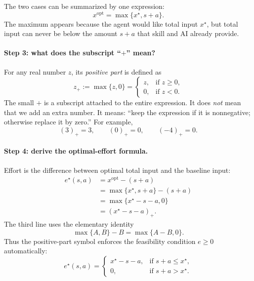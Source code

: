 \documentclass[11pt]{article}
\theoremstyle{tutorial}
\theoremstyle{remark}
\newcommand{\1}{\mathbb{I}}
\begin{document}
The two cases can be summarized by one expression:
\begin{equation}
  \boxed{x^{\mathrm{opt}}=\max\{x^\star,s+a\}.}
  \label{eq:optimal-total-input}
\end{equation}
The maximum appears because the agent would like total input $x^\star$, but total input can never be below
the amount $s+a$ that skill and AI already provide.

\paragraph{Step 3: what does the subscript ``$+$'' mean?}
For any real number $z$, its \emph{positive part} is defined as
\[
  z_+:=\max\{z,0\}
  =\begin{cases}
      z,&\text{if }z\ge0,\\
      0,&\text{if }z<0.
    \end{cases}
\]
The small $+$ is a subscript attached to the entire expression.  It does \emph{not} mean that we add an
extra number.  It means: ``keep the expression if it is nonnegative; otherwise replace it by zero.''  For
example,
\[
  (3)_+=3,
  \qquad
  (0)_+=0,
  \qquad
  (-4)_+=0.
\]

\paragraph{Step 4: derive the optimal-effort formula.}
Effort is the difference between optimal total input and the baseline input:
\begin{align*}
e^\star(s,a)
&=x^{\mathrm{opt}}-(s+a)\\
&=\max\{x^\star,s+a\}-(s+a)\\
&=\max\{x^\star-s-a,0\}\\
&=(x^\star-s-a)_+.
\end{align*}
The third line uses the elementary identity
\[
  \max\{A,B\}-B=\max\{A-B,0\}.
\]
Thus the positive-part symbol enforces the feasibility condition $e\ge0$ automatically:
\[
e^\star(s,a)=
\begin{cases}
x^\star-s-a,&\text{if }s+a\le x^\star,\\
0,&\text{if }s+a>x^\star.
\end{cases}
\]
\end{document}
